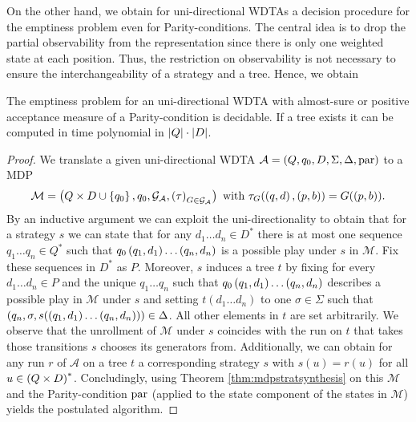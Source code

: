 On the other hand, we obtain for uni-directional \acp{WDTA} a decision 
procedure for the emptiness problem even for Parity-conditions. The central 
idea is to drop the partial observability from the representation since there
is only one weighted state at each position. Thus, the restriction on 
observability is not necessary to ensure the interchangeability of a strategy 
and a tree. Hence, we obtain
\begin{corollary}
  \cite[Corollary 47]{RandAutoInfTrees}
  The emptiness problem for an uni-directional \ac{WDTA} with almost-sure or
  positive acceptance measure of a  Parity-condition is decidable.
  If a tree exists it can be computed in time polynomial in
  $\left\vert{Q}\right\vert\cdot\left\vert{D}\right\vert$.
  \label{cor:unidirwdtaemptinessmdp}
\end{corollary}
\begin{proof}
  We translate a given uni-directional \ac{WDTA} 
  $\mathcal{A} = \left(Q, q_{0}, D, \Sigma, \Delta, \operatorname{par}\right)$ to a \ac{MDP}
  \begin{equation*}
    \mathcal{M} = \left(Q\times D\cup\left\{q_{0}\right\}, q_{0}, 
      \mathcal{G}_{\mathcal{A}}, \left(\tau\right)_{G\in\mathcal{G}_{\mathcal{A}}}\right)
    \text{ with }\tau_{G}(\left(q, d\right), \left(p, b\right)) = G(\left(p, b\right)).
  \end{equation*}
  By an inductive argument we can exploit the uni-directionality to obtain that
  for a strategy $s$ we can state that for any $d_{1}\dots d_{n}\in D^{*}$ 
  there is at most one sequence $q_{1}\dots q_{n}\in Q^{*}$ such that
  $q_{0}\left(q_{1}, d_{1}\right)\dots\left(q_{n}, d_{n}\right)$ is a possible play under 
  $s$ in $\mathcal{M}$. Fix these sequences in $D^{*}$ as $P$. Moreover, $s$ 
  induces a tree $t$ by fixing for every $d_{1}\dots d_{n}\in P$ and the
  unique $q_{1}\dots q_{n}$ such that 
  $q_{0}\left(q_{1}, d_{1}\right)\dots\left(q_{n}, d_{n}\right)$ describes a possible 
  play in $\mathcal{M}$ under $s$ and setting
  $t(d_{1}\dots d_{n})$ to one $\sigma\in\Sigma$ such that
  $\left(q_{n},\sigma, s(\left(q_{1}, d_{1}\right)\dots\left(q_{n}, d_{n}\right))\right)
    \in\Delta$. All other elements in $t$ are set arbitrarily. We observe that 
  the unrollment of $\mathcal{M}$ under $s$ coincides with the run on $t$ that 
  takes those transitions $s$ chooses its generators from. Additionally, we can
  obtain for any run $r$ of $\mathcal{A}$ on a tree $t$ a corresponding 
  strategy $s$ with $s(u) = r(u)$ for all $u\in \left(Q\times D\right)^{*}$. 
  Concludingly, using Theorem \ref{thm:mdpstratsynthesis} on this $\mathcal{M}$
  and the Parity-condition $\operatorname{par}$ (applied to the state component of the 
  states in $\mathcal{M}$) yields the postulated algorithm.
\end{proof}

